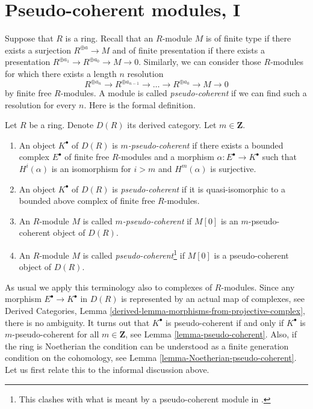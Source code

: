 \section{Pseudo-coherent modules, I}
\label{section-pseudo-coherent}

\noindent
Suppose that $R$ is a ring. Recall that an $R$-module $M$ is of finite type
if there exists a surjection $R^{\oplus a} \to M$ and of finite presentation
if there exists a presentation
$R^{\oplus a_1} \to R^{\oplus a_0} \to M \to 0$.
Similarly, we can consider those $R$-modules for which there exists
a length $n$ resolution
\begin{equation}
\label{equation-pseudo-coherent}
R^{\oplus a_n} \to R^{\oplus a_{n - 1}} \to \ldots \to R^{\oplus a_0} \to
M \to 0
\end{equation}
by finite free $R$-modules. A module is called {\it pseudo-coherent}
if we can find such a resolution for every $n$. Here is the formal
definition.

\begin{definition}
\label{definition-pseudo-coherent}
Let $R$ be a ring. Denote $D(R)$ its derived category.
Let $m \in \mathbf{Z}$.
\begin{enumerate}
\item An object $K^\bullet$ of $D(R)$ is {\it $m$-pseudo-coherent}
if there exists a bounded complex $E^\bullet$ of finite free $R$-modules
and a morphism $\alpha : E^\bullet \to K^\bullet$ such that
$H^i(\alpha)$ is an isomorphism for $i > m$ and $H^m(\alpha)$
is surjective.
\item An object $K^\bullet$ of $D(R)$ is {\it pseudo-coherent}
if it is quasi-isomorphic to a bounded above complex of finite
free $R$-modules.
\item An $R$-module $M$ is called {\it $m$-pseudo-coherent}
if $M[0]$ is an $m$-pseudo-coherent object of $D(R)$.
\item An $R$-module $M$ is called
{\it pseudo-coherent}\footnote{This clashes with what is meant by
a pseudo-coherent module in \cite{Bourbaki-CA}.}
if $M[0]$ is a pseudo-coherent object of $D(R)$.
\end{enumerate}
\end{definition}

\noindent
As usual we apply this terminology also to complexes of $R$-modules.
Since any morphism $E^\bullet \to K^\bullet$ in $D(R)$ is represented
by an actual map of complexes, see
Derived Categories, Lemma \ref{derived-lemma-morphisms-from-projective-complex},
there is no ambiguity.
It turns out that $K^\bullet$ is pseudo-coherent if and only if
$K^\bullet$ is $m$-pseudo-coherent for all $m \in \mathbf{Z}$, see
Lemma \ref{lemma-pseudo-coherent}.
Also, if the ring is Noetherian the condition can be understood
as a finite generation condition on the cohomology, see
Lemma \ref{lemma-Noetherian-pseudo-coherent}.
Let us first relate this to the informal discussion above.

